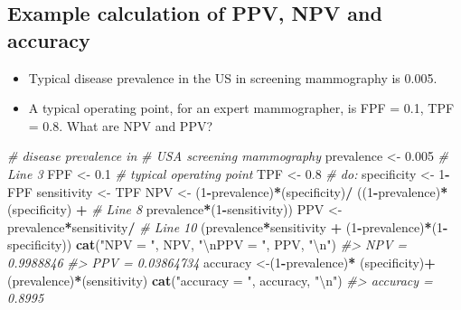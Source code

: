 \documentclass[
]{book}
\newenvironment{Shaded}{\begin{snugshade}}{\end{snugshade}}
\newcommand{\CharTok}[1]{\textcolor[rgb]{0.31,0.60,0.02}{#1}}
\newcommand{\CommentTok}[1]{\textcolor[rgb]{0.56,0.35,0.01}{\textit{#1}}}
\newcommand{\DecValTok}[1]{\textcolor[rgb]{0.00,0.00,0.81}{#1}}
\newcommand{\FloatTok}[1]{\textcolor[rgb]{0.00,0.00,0.81}{#1}}
\newcommand{\KeywordTok}[1]{\textcolor[rgb]{0.13,0.29,0.53}{\textbf{#1}}}
\newcommand{\NormalTok}[1]{#1}
\newcommand{\OperatorTok}[1]{\textcolor[rgb]{0.81,0.36,0.00}{\textbf{#1}}}
\newcommand{\StringTok}[1]{\textcolor[rgb]{0.31,0.60,0.02}{#1}}
\providecommand{\tightlist}{%
  \setlength{\itemsep}{0pt}\setlength{\parskip}{0pt}}
\begin{document}
\hypertarget{binaryTask0NpvPpvCode}{%
\subsection{Example calculation of PPV, NPV and accuracy}\label{binaryTask0NpvPpvCode}}

\begin{itemize}
\tightlist
\item
  Typical disease prevalence in the US in screening mammography is 0.005.
\item
  A typical operating point, for an expert mammographer, is FPF = 0.1, TPF = 0.8. What are NPV and PPV?
\end{itemize}

\begin{Shaded}
\begin{Highlighting}[]
\CommentTok{\# disease prevalence in }
\CommentTok{\# USA screening mammography}
\NormalTok{prevalence \textless{}{-}}\StringTok{ }\FloatTok{0.005} \CommentTok{\# Line 3}
\NormalTok{FPF \textless{}{-}}\StringTok{ }\FloatTok{0.1} \CommentTok{\# typical operating point}
\NormalTok{TPF \textless{}{-}}\StringTok{ }\FloatTok{0.8} \CommentTok{\#        do:}
\NormalTok{specificity \textless{}{-}}\StringTok{ }\DecValTok{1}\OperatorTok{{-}}\NormalTok{FPF}
\NormalTok{sensitivity \textless{}{-}}\StringTok{ }\NormalTok{TPF}
\NormalTok{NPV \textless{}{-}}\StringTok{ }\NormalTok{(}\DecValTok{1}\OperatorTok{{-}}\NormalTok{prevalence)}\OperatorTok{*}\NormalTok{(specificity)}\OperatorTok{/}
\StringTok{  }\NormalTok{((}\DecValTok{1}\OperatorTok{{-}}\NormalTok{prevalence)}\OperatorTok{*}\NormalTok{(specificity) }\OperatorTok{+}\StringTok{  }\CommentTok{\# Line 8}
\StringTok{     }\NormalTok{prevalence}\OperatorTok{*}\NormalTok{(}\DecValTok{1}\OperatorTok{{-}}\NormalTok{sensitivity))}
\NormalTok{PPV \textless{}{-}}\StringTok{ }\NormalTok{prevalence}\OperatorTok{*}\NormalTok{sensitivity}\OperatorTok{/}\StringTok{ }\CommentTok{\# Line 10}
\StringTok{  }\NormalTok{(prevalence}\OperatorTok{*}\NormalTok{sensitivity }\OperatorTok{+}\StringTok{ }
\StringTok{     }\NormalTok{(}\DecValTok{1}\OperatorTok{{-}}\NormalTok{prevalence)}\OperatorTok{*}\NormalTok{(}\DecValTok{1}\OperatorTok{{-}}\NormalTok{specificity))}
\KeywordTok{cat}\NormalTok{(}\StringTok{"NPV = "}\NormalTok{, NPV, }\StringTok{"}\CharTok{\textbackslash{}n}\StringTok{PPV = "}\NormalTok{, PPV, }\StringTok{"}\CharTok{\textbackslash{}n}\StringTok{"}\NormalTok{)}
\CommentTok{\#\textgreater{} NPV =  0.9988846 }
\CommentTok{\#\textgreater{} PPV =  0.03864734}
\NormalTok{accuracy \textless{}{-}(}\DecValTok{1}\OperatorTok{{-}}\NormalTok{prevalence)}\OperatorTok{*}
\StringTok{  }\NormalTok{(specificity)}\OperatorTok{+}\NormalTok{(prevalence)}\OperatorTok{*}\NormalTok{(sensitivity)}
\KeywordTok{cat}\NormalTok{(}\StringTok{"accuracy = "}\NormalTok{, accuracy, }\StringTok{"}\CharTok{\textbackslash{}n}\StringTok{"}\NormalTok{)}
\CommentTok{\#\textgreater{} accuracy =  0.8995}
\end{Highlighting}
\end{Shaded}
\end{document}
